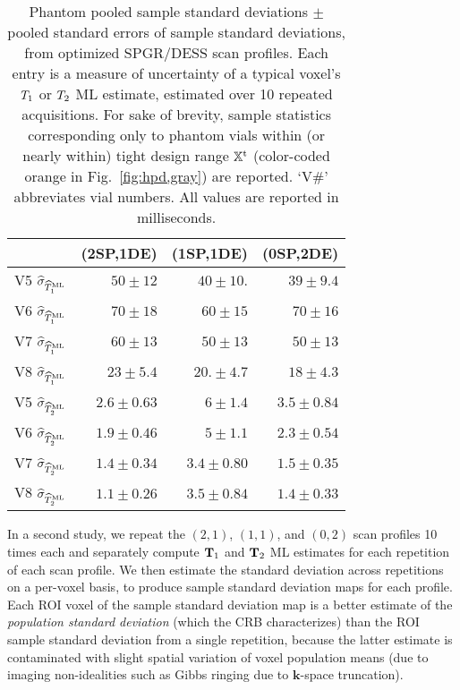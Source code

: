 \begin{table*} [!tb]
	\centering
	\begin{tabu} {c | r r r}
		\hline \hline
		 								& (2SP,1DE)				& (1SP,1DE) 			& (0SP,2DE)	\\
		\hline
		V5 $\widehat{\sigma}_{\widehat{T}_1^\mathrm{ML}}$ 	& $50 \pm 12$			& $40 \pm 10.$    & $39 \pm 9.4$ \\	
		V6 $\widehat{\sigma}_{\widehat{T}_1^\mathrm{ML}}$ 	& $70 \pm 18$ 		& $60 \pm 15$ 		& $70 \pm 16$ \\
		V7 $\widehat{\sigma}_{\widehat{T}_1^\mathrm{ML}}$ 	& $60 \pm 13$ 		& $50 \pm 13$ 		& $50 \pm 13$ \\
		V8 $\widehat{\sigma}_{\widehat{T}_1^\mathrm{ML}}$ 	& $23 \pm 5.4$ 		& $20. \pm 4.7$		& $18 \pm 4.3$ \\
		\hline \hline
		V5 $\widehat{\sigma}_{\widehat{T}_2^\mathrm{ML}}$ 	& $2.6 \pm 0.63$	& $6 \pm 1.4$			& $3.5 \pm 0.84$ \\
		V6 $\widehat{\sigma}_{\widehat{T}_2^\mathrm{ML}}$		& $1.9 \pm 0.46$ 	& $5 \pm 1.1$			& $2.3 \pm 0.54$ \\
		V7 $\widehat{\sigma}_{\widehat{T}_2^\mathrm{ML}}$ 	& $1.4 \pm 0.34$	& $3.4 \pm 0.80$ 	& $1.5 \pm 0.35$ \\
		V8 $\widehat{\sigma}_{\widehat{T}_2^\mathrm{ML}}$ 	& $1.1 \pm 0.26$	& $3.5 \pm 0.84$ 	& $1.4 \pm 0.33$ \\
		\hline \hline
	\end{tabu}
	\caption{
		Phantom pooled sample standard deviations 
		$\pm$ pooled standard errors of sample standard deviations, 
		from optimized SPGR/DESS scan profiles.
		Each entry is a measure of uncertainty 
		of a typical voxel's $T_1$ or $T_2$ ML estimate,
		estimated over 10 repeated acquisitions.
		For sake of brevity, 
		sample statistics corresponding only 
		to phantom vials within 
		(or nearly within) 
		tight design range $\mathbb{X}^\mathrm{t}$
		(color-coded orange in Fig.~\ref{fig:hpd,gray}) 
		are reported. 	
		`V\#' abbreviates vial numbers. 
		All values are reported in milliseconds.
	}
	\label{table:hpd,sample-std-dev}
\end{table*}

In a second study, 
we repeat the $(2,1)$, $(1,1)$, and $(0,2)$ scan profiles 
10 times each 
and separately compute $\mathbf{T}_1$ and $\mathbf{T}_2$ ML estimates
for each repetition of each scan profile. 
We then estimate the standard deviation across repetitions 
on a per-voxel basis, 
to produce sample standard deviation maps 
for each profile.
Each ROI voxel of the sample standard deviation map 
is a better estimate 
of the \emph{population standard deviation} 
(which the CRB characterizes) 
than the ROI sample standard deviation 
from a single repetition, 
because the latter estimate is contaminated 
with slight spatial variation 
of voxel population means 
(due to imaging non-idealities 
such as Gibbs ringing 
due to $\mathbf{k}$-space truncation).
	
